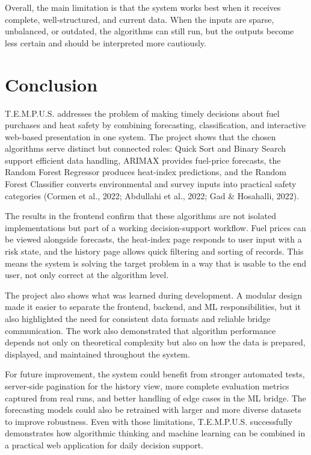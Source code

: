\documentclass[12pt]{article}
\begin{document}
Overall, the main limitation is that the system works best when it receives complete, well-structured, and current data. When the inputs are sparse, unbalanced, or outdated, the algorithms can still run, but the outputs become less certain and should be interpreted more cautiously.

\section{Conclusion}

T.E.M.P.U.S. addresses the problem of making timely decisions about fuel purchases and heat safety by combining forecasting, classification, and interactive web-based presentation in one system. The project shows that the chosen algorithms serve distinct but connected roles: Quick Sort and Binary Search support efficient data handling, ARIMAX provides fuel-price forecasts, the Random Forest Regressor produces heat-index predictions, and the Random Forest Classifier converts environmental and survey inputs into practical safety categories (Cormen et al., 2022; Abdullahi et al., 2022; Gad \& Hosahalli, 2022).

The results in the frontend confirm that these algorithms are not isolated implementations but part of a working decision-support workflow. Fuel prices can be viewed alongside forecasts, the heat-index page responds to user input with a risk state, and the history page allows quick filtering and sorting of records. This means the system is solving the target problem in a way that is usable to the end user, not only correct at the algorithm level.

The project also shows what was learned during development. A modular design made it easier to separate the frontend, backend, and ML responsibilities, but it also highlighted the need for consistent data formats and reliable bridge communication. The work also demonstrated that algorithm performance depends not only on theoretical complexity but also on how the data is prepared, displayed, and maintained throughout the system.

For future improvement, the system could benefit from stronger automated tests, server-side pagination for the history view, more complete evaluation metrics captured from real runs, and better handling of edge cases in the ML bridge. The forecasting models could also be retrained with larger and more diverse datasets to improve robustness. Even with those limitations, T.E.M.P.U.S. successfully demonstrates how algorithmic thinking and machine learning can be combined in a practical web application for daily decision support.
\end{document}
